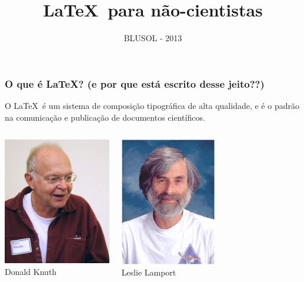 \documentclass{beamer}
\title{\textcolor{europeanalonis}{\LaTeX\ para não-cientistas}} \author[M. Weber Mendonça]
\institute[UFSC]{\inst{1} Universidade Federal de Santa Catarina}
\date{BLUSOL - 2013}
\begin{document}
\begin{frame}
  \titlepage
\end{frame}
\begin{frame}
   \frametitle{O que é \LaTeX? \small{(e por que está escrito desse jeito??)}}
   O \LaTeX\ é um sistema de composição tipográfica de alta qualidade, e é o padrão na comunicação e publicação de documentos científicos.
   \begin{columns}
      \column{5cm}
      \begin{center}
         \includegraphics[width=4.7cm]{knuth.jpg}\\
         Donald Knuth
      \end{center}
      \column{5cm}
      \begin{center}
         \includegraphics[width=4.2cm]{lamport.jpg}\\
         Leslie Lamport
      \end{center}
   \end{columns}
\end{frame}
\end{document}
